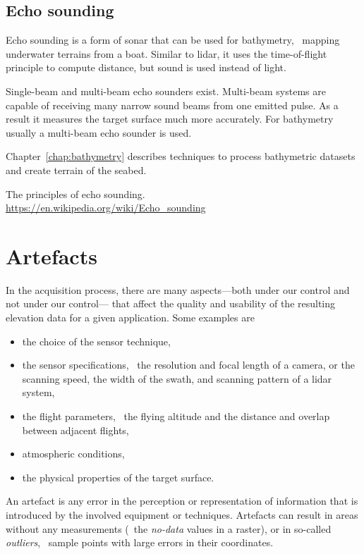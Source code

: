 \subsection{Echo sounding}%
\label{sec:mbes}
Echo sounding is a form of sonar that can be used for bathymetry, \ie\ mapping underwater terrains from a boat. 
Similar to lidar, it uses the time-of-flight principle to compute distance, but sound is used instead of light. 

Single-beam and multi-beam echo sounders exist. Multi-beam systems are capable of receiving many narrow sound beams from one emitted pulse. As a result it measures the target surface much more accurately. 
For bathymetry usually a multi-beam echo sounder is used.

Chapter~\ref{chap:bathymetry} describes techniques to process bathymetric datasets and create terrain of the seabed.

\begin{kaobox-toread}[frametitle=\faExternalLink\ To read or to watch]
  The principles of echo sounding.
  \\
  \url{https://en.wikipedia.org/wiki/Echo_sounding}
\end{kaobox-toread}




\section{Artefacts}%
\label{sec:artefacts}

In the acquisition process, there are many aspects---both under our control and not under our control--- that affect the quality and usability of the resulting elevation data for a given application. 
Some examples are
\begin{itemize}
	\item the choice of the sensor technique, 
	\item the sensor specifications, \eg\ the resolution and focal length of a camera, or the scanning speed, the width of the swath, and scanning pattern of a lidar system,
	\item the flight parameters, \eg\ the flying altitude and the distance and overlap between adjacent flights,
	\item atmospheric conditions, 
	\item the physical properties of the target surface.
\end{itemize}

An artefact is any error in the perception or representation of information that is introduced by the involved equipment or techniques. 
Artefacts can result in areas without any measurements (\eg\ the \emph{no-data} values in a raster), or in so-called \emph{outliers}, \ie\ sample points with large errors in their coordinates. 

